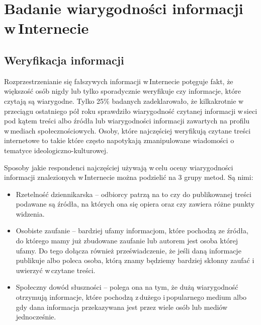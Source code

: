 \newpage
\section{Badanie wiarygodności informacji w\,Internecie}
\subsection{Weryfikacja informacji}
Rozprzestrzenianie się fałszywych informacji w\,Internecie potęguje fakt, że większość osób nigdy lub tylko sporadycznie weryfikuje czy informacje, które czytają są wiarygodne. Tylko 25\% badanych zadeklarowało, że kilkakrotnie w\,przeciągu ostatniego pół roku sprawdziło wiarygodność czytanej informacji w\,sieci pod kątem treści albo źródła lub wiarygodności informacji zawartych na profilu w\,mediach społecznościowych\cite{NASKBezpieczneWybory2019}. Osoby, które najczęściej weryfikują czytane treści internetowe to takie które często napotykają zmanipulowane wiadomości o tematyce ideologiczno-kulturowej.
\par
Sposoby jakie respondenci najczęściej używają w\,celu oceny wiarygodności informacji znalezionych w\,Internecie można podzielić na 3 grupy metod. Są nimi:
\begin{itemize}
    \item Rzetelność dziennikarska – odbiorcy patrzą na to czy do publikowanej treści podawane są źródła, na których ona się opiera oraz czy zawiera różne punkty widzenia. 
    \item Osobiste zaufanie – bardziej ufamy informacjom, które pochodzą ze źródła, do którego mamy już zbudowane zaufanie lub autorem jest osoba której ufamy. Do tego dołącza również przeświadczenie, że jeśli daną informacje publikuje albo poleca osoba, którą znamy będziemy bardziej skłonny zaufać i\,uwierzyć w\,czytane treści.
    \item Społeczny dowód słuszności – polega ona na tym, że dużą wiarygodność otrzymują informacje, które pochodzą z\,dużego i\,popularnego medium albo gdy dana informacja przekazywana jest przez wiele osób lub mediów jednocześnie.   
\end{itemize}

